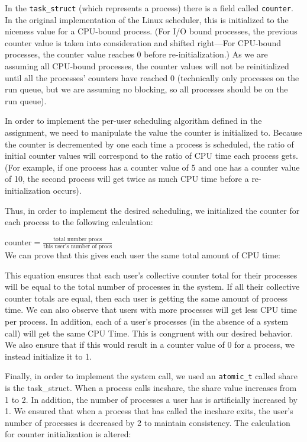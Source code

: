 \documentclass[10pt]{article}
\begin{document}
In the \texttt{task\_struct} (which represents a process) there is a field called \texttt{counter}. In the original implementation of the Linux scheduler, this is initialized to the niceness value for a CPU-bound process. (For I/O bound processes, the previous counter value is taken into consideration and shifted right—For CPU-bound processes, the counter value reaches 0 before re-initialization.) As we are assuming all CPU-bound processes, the counter values will not be reinitialized until all the processes' counters have reached 0 (technically only processes on the run queue, but we are assuming no blocking, so all processes should be on the run queue).

In order to implement the per-user scheduling algorithm defined in the assignment, we need to manipulate the value the counter is initialized to. Because the counter is decremented by one each time a process is scheduled, the ratio of initial counter values will correspond to the ratio of CPU time each process gets. (For example, if one process has a counter value of 5 and one has a counter value of 10, the second process will get twice as much CPU time before a re-initialization occurs).

Thus, in order to implement the desired scheduling, we initialized the counter for each process to the following calculation:

counter$ = \frac{\text{total number procs}}{\text{this user's number of procs}}$ \\
We can prove that this gives each user the same total amount of CPU time:

This equation ensures that each user's collective counter total for their processes will be equal to the total number of processes in the system. If all their collective counter totals are equal, then each user is getting the same amount of process time. We can also observe that users with more processes will get less CPU time per process. In addition, each of a user's processes (in the absence of a system call) will get the same CPU Time. This is congruent with our desired behavior. We also ensure that if this would result in a counter value of 0 for a process, we instead initialize it to 1.

Finally, in order to implement the system call, we used an \texttt{atomic\_t} called share is the task\_struct. When a process calls incshare, the share value increases from 1 to 2. In addition, the number of processes a user has is artificially increased by 1. We ensured that when a process that has called the incshare exits, the user's number of processes is decreased by 2 to maintain consistency. The calculation for counter initialization is altered:
\end{document}
